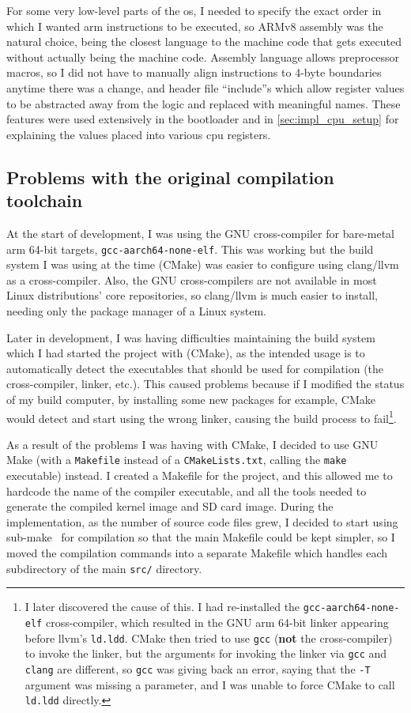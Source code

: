 \documentclass{article}
\begin{document}
For some very low-level parts of the \gls{os}, I needed to specify the exact
order in which I wanted \gls{arm} instructions to be executed, so ARMv8
assembly was the natural choice, being the closest language to the machine code
that gets executed without actually being the machine code. Assembly language
allows preprocessor macros, so I did not have to manually align instructions to
4-byte boundaries anytime there was a change, and header file ``include''s
which allow register values to be abstracted away from the logic and replaced
with meaningful names. These features were used extensively in the bootloader
and in \autoref{sec:impl_cpu_setup} for explaining the values placed into
various \gls{cpu} registers.

\subsection{Problems with the original compilation toolchain}
At the start of development, I was using the GNU cross-compiler for bare-metal
\gls{arm} 64-bit targets, \texttt{gcc-aarch64-none-elf}. This was working but
the build system I was using at the time (CMake) was easier to configure using
clang/llvm as a cross-compiler. Also, the GNU cross-compilers are not available
in most Linux distributions' core repositories, so clang/llvm is much easier to
install, needing only the package manager of a Linux system.

Later in development, I was having difficulties maintaining the build system
which I had started the project with (CMake), as the intended usage is to
automatically detect the executables that should be used for compilation (the
cross-compiler, linker, etc.). This caused problems because if I modified the
status of my build computer, by installing some new packages for example, CMake
would detect and start using the wrong linker, causing the build process to
fail\footnote{I later discovered the cause of this. I had re-installed the
\texttt{gcc-aarch64-none-elf} cross-compiler, which resulted in the GNU
\gls{arm} 64-bit linker appearing before llvm's \texttt{ld.ldd}. CMake then
tried to use \texttt{gcc} (\textbf{not} the cross-compiler) to invoke the
linker, but the arguments for invoking the linker via \texttt{gcc} and
\texttt{clang} are different, so \texttt{gcc} was giving back an error, saying
that the \texttt{-T} argument was missing a parameter, and I was unable to
force CMake to call \texttt{ld.ldd} directly.}.

As a result of the problems I was having with CMake, I decided to use GNU Make
(with a \texttt{Makefile} instead of a \texttt{CMakeLists.txt}, calling the
\texttt{make} executable) instead. I created a Makefile for the project, and
this allowed me to hardcode the name of the compiler executable, and all the
tools needed to generate the compiled kernel image and SD card image. During
the implementation, as the number of source code files grew, I decided to start
using sub-make~\cite{sub-make} for compilation so that the main Makefile could
be kept simpler, so I moved the compilation commands into a separate Makefile
which handles each subdirectory of the main \texttt{src/} directory.
\end{document}
